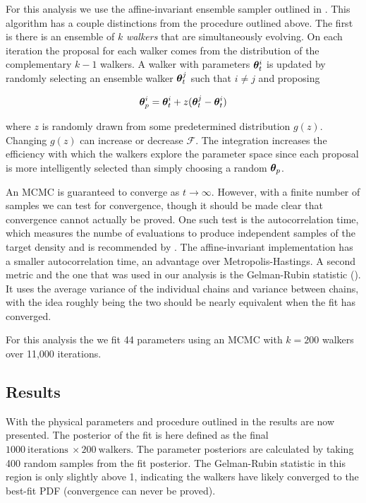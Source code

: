 For this analysis we use the affine-invariant ensemble sampler outlined in .  This algorithm has a couple
distinctions from the procedure outlined above.  The first is there is an ensemble of $k$ \textit{walkers} that are simultaneously
evolving.  On each iteration the proposal for
each walker comes from the distribution of the complementary $k - 1$ walkers.  A walker with parameters $\boldsymbol{\theta}_{t}^i$
is updated by randomly selecting an ensemble walker $\boldsymbol{\theta}_{t}^j$ such that $i \neq j$ and proposing

\begin{equation}
\boldsymbol{\theta}_{p}^{i} = \boldsymbol{\theta}_{t}^{i} + z(\boldsymbol{\theta}_{t}^{j} - \boldsymbol{\theta}_{t}^{i})
\end{equation}

\noindent where $z$ is randomly drawn from some predetermined distribution $g(z)$.  Changing $g(z)$ can increase or decrease
$\mathcal{F}$.  The integration increases the efficiency with which the walkers explore the parameter space since each proposal is more
intelligently selected than simply choosing a random $\boldsymbol{\theta}_p$.

An MCMC is guaranteed to converge as $t \rightarrow \infty$.  However, with a finite number of samples we can test for convergence, though
it should be made clear that convergence cannot actually be proved.  One such test is the autocorrelation time, which measures the numbe
of evaluations to produce independent samples of the target density and is recommended by .  The affine-invariant
implementation has a smaller autocorrelation time, an advantage over Metropolis-Hastings.  A second metric and the one that was used in
our analysis is the Gelman-Rubin statistic ().  It uses the average variance of the individual chains and variance
between chains, with the idea roughly being the two should be nearly equivalent when the fit has converged.

For this analysis the we fit 44 parameters using an MCMC with $k = 200$ walkers over 11,000 iterations.



\subsection{Results}
\label{subsec:er_nr_calibrations_results}
With the physical parameters and procedure outlined in  the results are now
presented.  The posterior of the fit is here defined as the final $1000\ \mathrm{iterations}\ \times 200\ \mathrm{walkers}$.  The
parameter posteriors are calculated by taking 400 random samples from the fit posterior.  The Gelman-Rubin statistic in this region is
only slightly above 1, indicating the walkers have likely converged to the best-fit PDF (convergence can never be proved).

